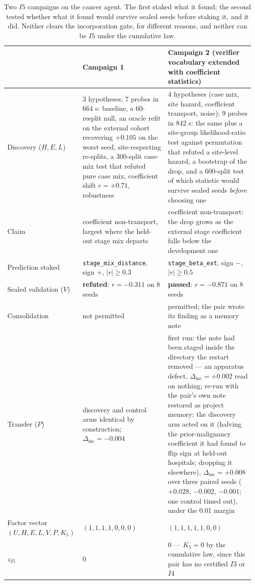 \begin{table}[!htbp]
\centering\small
\begin{tabularx}{\textwidth}{@{}lYY@{}}
\toprule
 & Campaign 1 & Campaign 2 (verifier vocabulary extended with coefficient statistics) \\
\midrule
Discovery ($H, E, L$) & 3 hypotheses; 7 probes in 664 s: baseline, a 60-resplit null, an oracle refit on the external cohort recovering $+0.105$ on the worst seed, site-respecting re-splits, a 300-split case-mix test that refuted pure case mix, coefficient shift $r = +0.71$, robustness & 4 hypotheses (case mix, site hazard, coefficient transport, noise); 9 probes in 842 s: the same plus a site-group likelihood-ratio test against permutation that refuted a site-level hazard, a bootstrap of the drop, and a 600-split test of which statistic would survive sealed seeds \emph{before} choosing one \\
Claim & coefficient non-transport, largest where the held-out stage mix departs & coefficient non-transport: the drop grows as the external stage coefficient falls below the development one \\
Prediction staked & \texttt{stage\_mix\_distance}, sign $+$, $|r| \ge 0.3$ & \texttt{stage\_beta\_ext}, sign $-$, $|r| \ge 0.5$ \\
Sealed validation ($V$) & \textbf{refuted}: $r = -0.311$ on 8 seeds & \textbf{passed}: $r = -0.871$ on 8 seeds \\
Consolidation & not permitted & permitted; the pair wrote its finding as a memory note \\
Transfer ($P$) & discovery and control arms identical by construction; $\Delta_{\mathrm{inc}} = -0.004$ & first run: the note had been staged inside the directory the restart removed --- an apparatus defect, $\Delta_{\mathrm{inc}} = +0.002$ read on nothing; re-run with the pair's own note restored as project memory: the discovery arm acted on it (halving the prior-malignancy coefficient it had found to flip sign at held-out hospitals; dropping it elsewhere), $\Delta_{\mathrm{inc}} = +0.008$ over three paired seeds ($+0.028$, $-0.002$, $-0.001$; one control timed out), under the 0.01 margin \\
Factor vector $(U,H,E,L,V,P,K_5)$ & $(1,1,1,1,0,0,0)$ & $(1,1,1,1,1,0,0)$ \\
$z_{I5}$ & 0 & 0 --- $K_5 = 0$ by the cumulative law, since this pair has no certified $I3$ or $I4$ \\
\bottomrule
\end{tabularx}
\caption{Two $I5$ campaigns on the cancer agent. The first staked what it found; the second tested whether what it found would survive sealed seeds before staking it, and it did. Neither clears the incorporation gate, for different reasons, and neither can be $I5$ under the cumulative law.}
\label{tab:i5}
\end{table}

